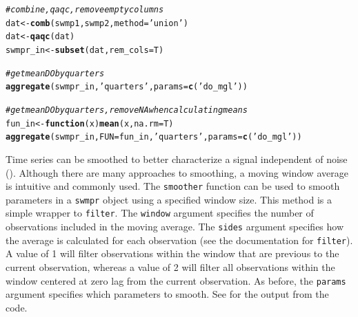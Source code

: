 \documentclass[10pt,letterpaper]{article}\usepackage[]{graphicx}\usepackage[]{color}
\makeatletter
\newcommand{\hlstr}[1]{\textcolor[rgb]{0.192,0.494,0.8}{#1}}%
\newcommand{\hlcom}[1]{\textcolor[rgb]{0.678,0.584,0.686}{\textit{#1}}}%
\newcommand{\hlstd}[1]{\textcolor[rgb]{0.345,0.345,0.345}{#1}}%
\newcommand{\hlkwa}[1]{\textcolor[rgb]{0.161,0.373,0.58}{\textbf{#1}}}%
\newcommand{\hlkwb}[1]{\textcolor[rgb]{0.69,0.353,0.396}{#1}}%
\newcommand{\hlkwc}[1]{\textcolor[rgb]{0.333,0.667,0.333}{#1}}%
\newcommand{\hlkwd}[1]{\textcolor[rgb]{0.737,0.353,0.396}{\textbf{#1}}}%
\newenvironment{kframe}{%
 \def\at@end@of@kframe{}%
 \ifinner\ifhmode%
  \def\at@end@of@kframe{\end{minipage}}%
  \begin{minipage}{\columnwidth}%
 \fi\fi%
 \def\FrameCommand##1{\hskip\@totalleftmargin \hskip-\fboxsep
 \colorbox{shadecolor}{##1}\hskip-\fboxsep
     \hskip-\linewidth \hskip-\@totalleftmargin \hskip\columnwidth}%
 \MakeFramed {\advance\hsize-\width
   \@totalleftmargin\z@ \linewidth\hsize
   \@setminipage}}%
 {\par\unskip\endMakeFramed%
 \at@end@of@kframe}
\newenvironment{knitrout}{}{} %
\makeatother
\begin{document}
\begin{knitrout}
\color{fgcolor}\begin{kframe}
\begin{alltt}
\hlcom{# combine, qaqc, remove empty columns}
\hlstd{dat} \hlkwb{<-} \hlkwd{comb}\hlstd{(swmp1, swmp2,} \hlkwc{method} \hlstd{=} \hlstr{'union'}\hlstd{)}
\hlstd{dat} \hlkwb{<-} \hlkwd{qaqc}\hlstd{(dat)}
\hlstd{swmpr_in} \hlkwb{<-} \hlkwd{subset}\hlstd{(dat,} \hlkwc{rem_cols} \hlstd{= T)}

\hlcom{# get mean DO by quarters}
\hlkwd{aggregate}\hlstd{(swmpr_in,} \hlstr{'quarters'}\hlstd{,} \hlkwc{params} \hlstd{=} \hlkwd{c}\hlstd{(}\hlstr{'do_mgl'}\hlstd{))}

\hlcom{# get mean DO by quarters, remove NA when calculating means}
\hlstd{fun_in} \hlkwb{<-} \hlkwa{function}\hlstd{(}\hlkwc{x}\hlstd{)} \hlkwd{mean}\hlstd{(x,} \hlkwc{na.rm} \hlstd{= T)}
\hlkwd{aggregate}\hlstd{(swmpr_in,} \hlkwc{FUN} \hlstd{= fun_in,} \hlstr{'quarters'}\hlstd{,} \hlkwc{params} \hlstd{=} \hlkwd{c}\hlstd{(}\hlstr{'do_mgl'}\hlstd{))}
\end{alltt}
\end{kframe}
\end{knitrout}

Time series can be smoothed to better characterize a signal independent of noise ().  Although there are many approaches to smoothing, a moving window average is intuitive and commonly used.  The \texttt{smoother} function can be used to smooth parameters in a \texttt{swmpr} object using a specified window size.  This method is a simple wrapper to \texttt{filter}.  The \texttt{window} argument specifies the number of observations included in the moving average.  The \texttt{sides} argument specifies how the average is calculated for each observation (see the documentation for \texttt{filter}).  A value of 1 will filter observations within the window that are previous to the current observation, whereas a value of 2 will filter all observations within the window centered at zero lag from the current observation. As before, the \texttt{params} argument specifies which parameters to smooth.  See  for the output from the code.
\end{document}
